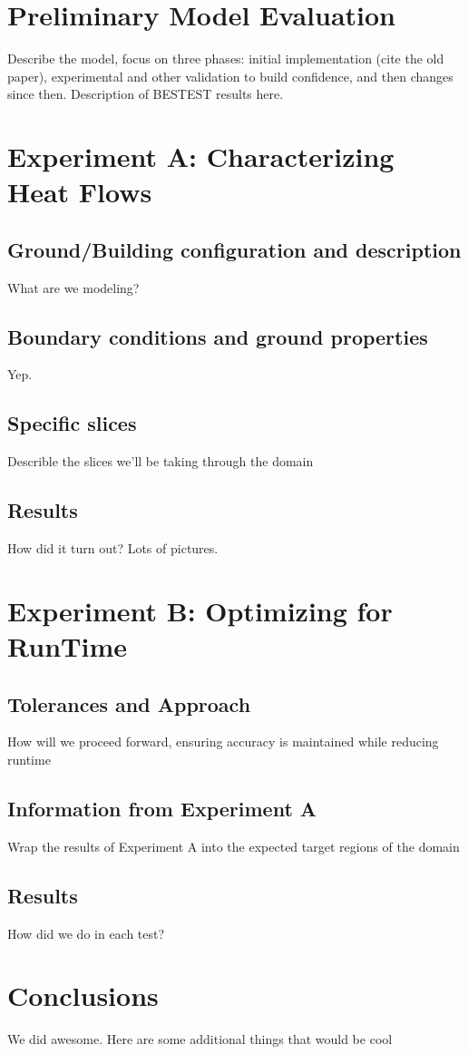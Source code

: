 \documentclass{article}
\begin{document}
 \section*{Preliminary Model Evaluation} 
  Describe the model, focus on three phases: initial implementation (cite the old paper), experimental and other validation to build confidence, and then changes since then.  Description of BESTEST results here.
 
 \section*{Experiment A: Characterizing Heat Flows}

  \subsection*{Ground/Building configuration and description}
   What are we modeling?

  \subsection*{Boundary conditions and ground properties}
   Yep. 

  \subsection*{Specific slices}
   Describle the slices we'll be taking through the domain 

  \subsection*{Results}
   How did it turn out?  Lots of pictures.

 \section*{Experiment B: Optimizing for RunTime}

  \subsection*{Tolerances and Approach}
   How will we proceed forward, ensuring accuracy is maintained while reducing runtime

  \subsection*{Information from Experiment A}
   Wrap the results of Experiment A into the expected target regions of the domain

  \subsection*{Results}
   How did we do in each test?

 \section*{Conclusions}
  We did awesome.  Here are some additional things that would be cool

 
  
\end{document}
